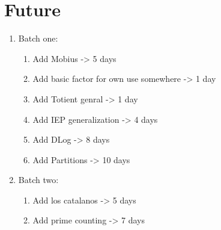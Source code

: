 \documentclass[12pt]{article}
\begin{document}
\section{Future}
\begin{enumerate}
	\item Batch one:
	\begin {enumerate}
		\item Add Mobius -> 5 days
		\item Add basic factor for own use somewhere -> 1 day
		\item Add Totient genral -> 1 day
		\item Add IEP generalization -> 4 days
		\item Add DLog -> 8 days
		\item Add Partitions -> 10 days
	\end{enumerate}

	\item Batch two:
	\begin {enumerate}
		\item Add los catalanos -> 5 days
		\item Add prime counting -> 7 days
	\end{enumerate}
\end{enumerate}
\end{document}
